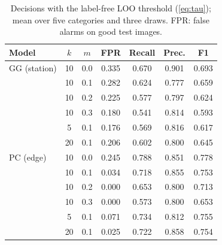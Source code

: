 \begin{table}[t]
\centering
\caption{Decisions with the label-free LOO threshold (\ref{eq:tau}); mean over five categories and three draws. FPR: false alarms on good test images.}
\label{tab:threshold}
\footnotesize
\begin{tabular}{@{}lcccccc@{}}
\toprule
Model & $k$ & $m$ & FPR & Recall & Prec. & F1 \\
\midrule
GG (station) & 10 & 0.0 & 0.335 & 0.670 & 0.901 & 0.693 \\
 & 10 & 0.1 & 0.282 & 0.624 & 0.777 & 0.659 \\
 & 10 & 0.2 & 0.225 & 0.577 & 0.797 & 0.624 \\
 & 10 & 0.3 & 0.180 & 0.541 & 0.814 & 0.593 \\
 & 5 & 0.1 & 0.176 & 0.569 & 0.816 & 0.617 \\
 & 20 & 0.1 & 0.206 & 0.602 & 0.800 & 0.645 \\ \midrule
PC (edge) & 10 & 0.0 & 0.245 & 0.788 & 0.851 & 0.778 \\
 & 10 & 0.1 & 0.034 & 0.718 & 0.855 & 0.753 \\
 & 10 & 0.2 & 0.000 & 0.653 & 0.800 & 0.713 \\
 & 10 & 0.3 & 0.000 & 0.573 & 0.800 & 0.653 \\
 & 5 & 0.1 & 0.071 & 0.734 & 0.812 & 0.755 \\
 & 20 & 0.1 & 0.025 & 0.722 & 0.858 & 0.754 \\
\bottomrule
\end{tabular}
\end{table}
